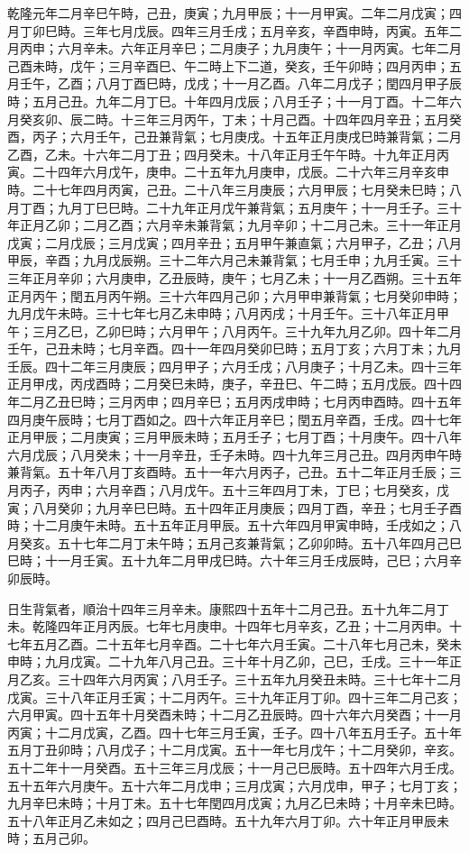 \begin{pinyinscope}
乾隆元年二月辛巳午時，己丑，庚寅；九月甲辰；十一月甲寅。二年二月戊寅；四月丁卯巳時。三年七月戊辰。四年三月壬戌；五月辛亥，辛酉申時，丙寅。五年二月丙申；六月辛未。六年正月辛巳；二月庚子；九月庚午；十一月丙寅。七年二月己酉未時，戊午；三月辛酉巳、午二時上下二道，癸亥，壬午卯時；四月丙申；五月壬午，乙酉；八月丁酉巳時，戊戌；十一月乙酉。八年二月戊子；閏四月甲子辰時；五月己丑。九年二月丁巳。十年四月戊辰；八月壬子；十一月丁酉。十二年六月癸亥卯、辰二時。十三年三月丙午，丁未；十月己酉。十四年四月辛丑；五月癸酉，丙子；六月壬午，己丑兼背氣；七月庚戌。十五年正月庚戌巳時兼背氣；二月乙酉，乙未。十六年二月丁丑；四月癸未。十八年正月壬午午時。十九年正月丙寅。二十四年六月戊午，庚申。二十五年九月庚申，戊辰。二十六年三月辛亥申時。二十七年四月丙寅，己丑。二十八年三月庚辰；六月甲辰；七月癸未巳時；八月丁酉；九月丁巳巳時。二十九年正月戊午兼背氣；五月庚午；十一月壬子。三十年正月乙卯；二月乙酉；六月辛未兼背氣；九月辛卯；十二月己未。三十一年正月戊寅；二月戊辰；三月戊寅；四月辛丑；五月甲午兼直氣；六月甲子，乙丑；八月甲辰，辛酉；九月戊辰朔。三十二年六月己未兼背氣；七月壬申；九月壬寅。三十三年正月辛卯；六月庚申，乙丑辰時，庚午；七月乙未；十一月乙酉朔。三十五年正月丙午；閏五月丙午朔。三十六年四月己卯；六月甲申兼背氣；七月癸卯申時；九月戊午未時。三十七年七月乙未申時；八月丙戌；十月壬午。三十八年正月甲午；三月乙巳，乙卯巳時；六月甲午；八月丙午。三十九年九月乙卯。四十年二月壬午，己丑未時；七月辛酉。四十一年四月癸卯巳時；五月丁亥；六月丁未；九月壬辰。四十二年三月庚辰；四月甲子；六月壬戌；八月庚子；十月乙未。四十三年正月甲戌，丙戌酉時；二月癸巳未時，庚子，辛丑巳、午二時；五月戊辰。四十四年二月乙丑巳時；三月丙申；四月辛巳；五月丙戌申時；七月丙申酉時。四十五年四月庚午辰時；七月丁酉如之。四十六年正月辛巳；閏五月辛酉，壬戌。四十七年正月甲辰；二月庚寅；三月甲辰未時；五月壬子；七月丁酉；十月庚午。四十八年六月戊辰；八月癸未；十一月辛丑，壬子未時。四十九年三月己丑。四月丙申午時兼背氣。五十年八月丁亥酉時。五十一年六月丙子，己丑。五十二年正月壬辰；三月丙子，丙申；六月辛酉；八月戊午。五十三年四月丁未，丁巳；七月癸亥，戊寅；八月癸卯；九月辛巳巳時。五十四年正月庚辰；四月丁酉，辛丑；七月壬子酉時；十二月庚午未時。五十五年正月甲辰。五十六年四月甲寅申時，壬戌如之；八月癸亥。五十七年二月丁未午時；五月己亥兼背氣；乙卯卯時。五十八年四月己巳巳時；十一月壬寅。五十九年二月甲戌巳時。六十年三月壬戌辰時，己巳；六月辛卯辰時。

日生背氣者，順治十四年三月辛未。康熙四十五年十二月己丑。五十九年二月丁未。乾隆四年正月丙辰。七年七月庚申。十四年七月辛亥，乙丑；十二月丙申。十七年五月乙酉。二十五年七月辛酉。二十七年六月壬寅。二十八年七月己未，癸未申時；九月戊寅。二十九年八月己丑。三十年十月乙卯，己巳，壬戌。三十一年正月乙亥。三十四年六月丙寅；八月壬子。三十五年九月癸丑未時。三十七年十二月戊寅。三十八年正月壬寅；十二月丙午。三十九年正月丁卯。四十三年二月己亥；六月甲寅。四十五年十月癸酉未時；十二月乙丑辰時。四十六年六月癸酉；十一月丙寅；十二月戊寅，乙酉。四十七年三月壬寅，壬子。四十八年五月壬子。五十年五月丁丑卯時；八月戊子；十二月戊寅。五十一年七月戊午；十二月癸卯，辛亥。五十二年十一月癸酉。五十三年三月戊辰；十一月己巳辰時。五十四年六月壬戌。五十五年六月庚午。五十六年二月戊申；三月戊寅；六月戊申，甲子；七月丁亥；九月辛巳未時；十月丁未。五十七年閏四月戊寅；九月乙巳未時；十月辛未巳時。五十八年正月乙未如之；四月己巳酉時。五十九年六月丁卯。六十年正月甲辰未時；五月己卯。


\end{pinyinscope}
